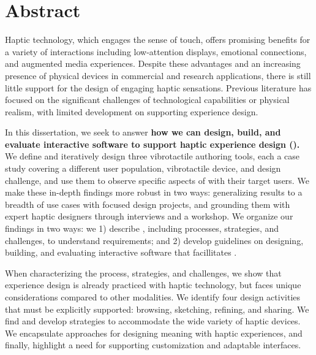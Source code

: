 
\chapter{Abstract}

Haptic technology, which engages the sense of touch, offers promising benefits for a variety of interactions including low-attention displays, emotional connections, and augmented media experiences.
Despite these advantages and an increasing presence of physical devices in commercial and research applications, there is still little support for the design of engaging haptic sensations.
Previous literature has focused on the significant challenges of technological capabilities or physical realism, with limited development on supporting experience design. %

In this dissertation, we seek to answer \textbf{how we can design, build, and evaluate interactive software to support haptic experience design (\haxd).}
We define \haxd and iteratively design three vibrotactile authoring tools, each a case study covering a different user population, vibrotactile device, and design challenge, and use them to observe specific aspects of \haxd with their target users.
We make these in-depth findings more robust in two ways: generalizing results to a breadth of use cases with focused design projects, and grounding them with expert haptic designers through interviews and a workshop.
We organize our findings in two ways: we 1) describe \haxd, including processes, strategies, and challenges, to understand requirements; and 2) develop guidelines on designing, building, and evaluating interactive software that facillitates \haxd.

When characterizing the \haxd process, strategies, and challenges, 
we show that experience design is already practiced with haptic technology, but faces unique considerations compared to other modalities. 
We identify four design activities that must be explicitly supported: browsing, sketching, refining, and sharing.
We find and develop strategies to accommodate the wide variety of haptic devices.
We encapsulate approaches for designing meaning with haptic experiences, and finally, highlight a need for supporting customization and adaptable interfaces.

